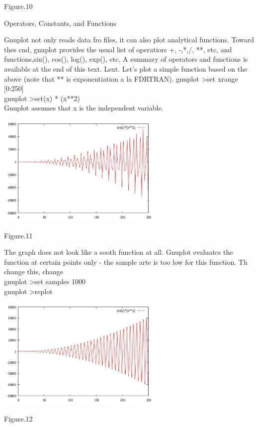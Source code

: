\documentclass[onecolumn,journal] {IEEEtran}
\begin{document}
\begin{center}
Figure.10
\end{center}
\begin{flushleft}
\begin{Large}
Operators, Constants, and Functions \\
\end{Large}
Gnuplot not only reads data fro files, it can also plot analytical functions. Toward thes cnd, gnuplot provides the  usual list of operatiors +, -,*,/, **, etc, and functions,sin(), cos(), log(), exp(), etc, A summary of operators and functions is available at the end of this text. Lext. Let's plot a simple function based on the above (note  that ** is exponentiation a la FDRTRAN).
\newline
gnuplot  \textgreater  set  xrange [0:250]\\
gnuplot  \textgreater  set(x) * (x**2)\\
Gnuplot assumes that x is  the independent variable. 
\end{flushleft}
 \center
\includegraphics[width=8cm]{sinx1.jpg}
\begin{center}
Figure.11
\end{center}
\begin{flushleft}
The graph does not look like a sooth function at all. Gnuplot evaluatcs the function at  certain points only - the sample arte is too low for this function. Th change this, change\\
gnuplot  \textgreater  set  samples 1000 \\
gnuplot  \textgreater replot \\
\end{flushleft}

 \center
\includegraphics[width=8cm]{sinx3.jpg}
\begin{center}
 Figure.12
\end{center}
\end{document}
